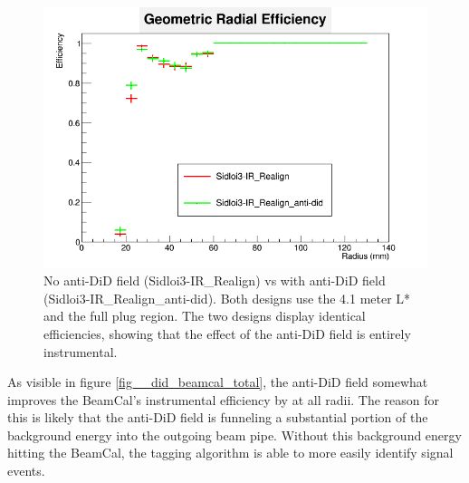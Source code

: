 \documentclass{report}
\begin{document}
                \begin{figure}[H]
                    \includegraphics[height=.4\textheight]{RadialEfficiency_geometric_did}
                    \centering
                    \caption{No anti-DiD field (Sidloi3-IR\_Realign) vs with anti-DiD field 
                            (Sidloi3-IR\_Realign\_anti-did). Both designs use the 4.1 meter L*
                            and the full plug region. The two designs display identical efficiencies,
                            showing that the effect of the anti-DiD field is entirely instrumental.}
                    \label{fig__did_beamcal_geom}
                \end{figure}

                As visible in figure \ref{fig__did_beamcal_total}, the anti-DiD field somewhat improves the BeamCal's instrumental efficiency by  at all radii. The reason for this is likely that the anti-DiD field is funneling a substantial portion of the background energy into the outgoing beam pipe. Without this background energy hitting the BeamCal, the tagging algorithm is able to more easily identify signal events.
\end{document}
